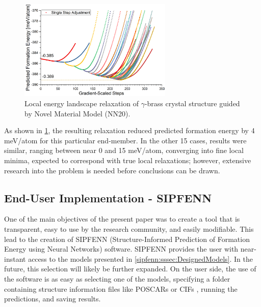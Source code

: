 \begin{figure}[H]
    \centering
    \includegraphics[width=0.65\textwidth]{sipfenn/localRelaxation_6.png}
    \caption{Local energy landscape relaxation of  $\gamma$-brass crystal structure guided by Novel Material Model (NN20).}
    \label{sipfenn:fig:localrelaxationpdzn}
\end{figure}

As shown in \ref{sipfenn:fig:localrelaxationpdzn}, the resulting relaxation reduced predicted formation energy by 4 meV/atom for this particular end-member. In the other 15 cases, results were similar, ranging between near 0 and 15 meV/atom, converging into fine local minima, expected to correspond with true local relaxations; however, extensive research into the problem is needed before conclusions can be drawn.


\subsection{End-User Implementation - SIPFENN} \label{sipfenn:ssec:SIPFENN}

One of the main objectives of the present paper was to create a tool that is transparent, easy to use by the research community, and easily modifiable. This lead to the creation of SIPFENN (Structure-Informed Prediction of Formation Energy using Neural Networks) software. SIPFENN provides the user with near-instant access to the models presented in \ref{sipfenn:sssec:DesignedModels}. In the future, this selection will likely be further expanded. On the user side, the use of the software is as easy as selecting one of the models, specifying a folder containing structure information files like POSCARs \cite{POSCARFile} or CIFs \cite{Hall1991TheCrystallography}, running the predictions, and saving results.

